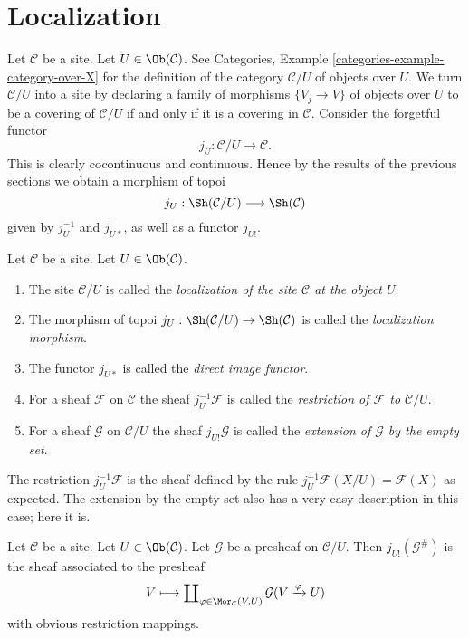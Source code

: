 







\section{Localization}
\label{section-localize}

\noindent
Let $\mathcal{C}$ be a site.
Let $U \in \Ob(\mathcal{C})$.
See
Categories, Example \ref{categories-example-category-over-X}
for the definition of the category $\mathcal{C}/U$ of
objects over $U$. We turn $\mathcal{C}/U$ into a site
by declaring a family of morphisms $\{V_j \to V\}$ of
objects over $U$ to be a covering of $\mathcal{C}/U$
if and only if it is a covering in $\mathcal{C}$.
Consider the forgetful functor
$$
j_U : \mathcal{C}/U \longrightarrow \mathcal{C}.
$$
This is clearly cocontinuous and continuous. Hence by the
results of the previous sections we obtain a morphism of topoi
$$
j_U : \Sh(\mathcal{C}/U) \longrightarrow \Sh(\mathcal{C})
$$
given by $j_U^{-1}$ and $j_{U*}$, as well as a functor $j_{U!}$.

\begin{definition}
\label{definition-localize}
Let $\mathcal{C}$ be a site.
Let $U \in \Ob(\mathcal{C})$.
\begin{enumerate}
\item The site $\mathcal{C}/U$ is called the {\it localization of
the site $\mathcal{C}$ at the object $U$}.
\item The morphism of topoi
$j_U : \Sh(\mathcal{C}/U) \to \Sh(\mathcal{C})$
is called the {\it localization morphism}.
\item The functor $j_{U*}$ is called the {\it direct image functor}.
\item For a sheaf $\mathcal{F}$ on $\mathcal{C}$ the sheaf
$j_U^{-1}\mathcal{F}$ is called the {\it restriction of $\mathcal{F}$
to $\mathcal{C}/U$}.
\item For a sheaf $\mathcal{G}$ on $\mathcal{C}/U$
the sheaf $j_{U!}\mathcal{G}$ is called the
{\it extension of $\mathcal{G}$ by the empty set}.
\end{enumerate}
\end{definition}

\noindent
The restriction $j_U^{-1}\mathcal{F}$ is the sheaf
defined by the rule $j_U^{-1}\mathcal{F}(X/U) = \mathcal{F}(X)$ as expected.
The extension by the empty set also has a very easy description in
this case; here it is.

\begin{lemma}
\label{lemma-describe-j-shriek}
Let $\mathcal{C}$ be a site.
Let $U \in \Ob(\mathcal{C})$.
Let $\mathcal{G}$ be a presheaf on $\mathcal{C}/U$.
Then $j_{U!}(\mathcal{G}^\#)$ is the sheaf associated to the presheaf
$$
V
\longmapsto
\coprod\nolimits_{\varphi \in \Mor_\mathcal{C}(V, U)}
\mathcal{G}(V \xrightarrow{\varphi} U)
$$
with obvious restriction mappings.
\end{lemma}


